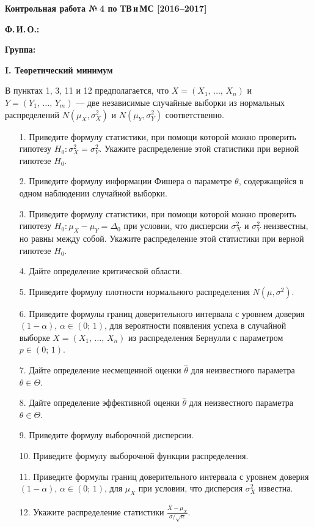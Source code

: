 \documentclass[a4paper, 12pt]{article}
\begin{document}
\begin{center}
    \textbf{\textbf{\large Контрольная работа №\,4 по ТВ\,и\,МС [2016--2017]}}
\end{center}


\textbf{Ф.\,И.\,О.:}

\textbf{Группа:}

\bigskip

\textbf{I. Теоретический минимум}

\medskip

В пунктах 1, 3, 11 и 12 предполагается, что $X = (X_1, \, \ldots, \, X_n)$ и $Y = (Y_1, \, \ldots, \, Y_m)$ --- две независимые случайные выборки из нормальных распределений $N(\mu_X, \sigma_X^2)$ и $N(\mu_Y, \sigma_Y^2)$ соответственно.

\begin{itemize}
  \item[1.] Приведите формулу статистики, при помощи которой можно проверить гипотезу $H_0 \colon \sigma_X^2 = \sigma_Y^2$. Укажите распределение этой статистики при верной гипотезе $H_0$.
  \item[2.] Приведите формулу информации Фишера о параметре $\theta$, содержащейся в одном наблюдении случайной выборки.
  \item[3.] Приведите формулу статистики, при помощи которой можно проверить гипотезу $H_0 \colon \mu_X - \mu_Y = \Delta_0$ при условии, что дисперсии $\sigma_X^2$ и $\sigma_Y^2$ неизвестны, но равны между собой. Укажите распределение этой статистики при верной гипотезе $H_0$.
  \item[4.] Дайте определение критической области.
  \item[5.] Приведите формулу плотности нормального распределения $N(\mu, \sigma^2)$.
  \item[6.] Приведите формулы границ доверительного интервала с уровнем доверия $(1 - \alpha)$, $\alpha \in (0;\,1)$, для вероятности появления успеха в случайной выборке $X = (X_1, \, \ldots, \, X_n)$ из распределения Бернулли с параметром $p \in (0;\,1)$.
  \item[7.] Дайте определение несмещенной оценки $\widehat{\theta}$ для неизвестного параметра $\theta \in \Theta$.
  \item[8.] Дайте определение эффективной оценки $\widehat{\theta}$ для неизвестного параметра $\theta \in \Theta$.
  \item[9.] Приведите формулу выборочной дисперсии.
  \item[10.] Приведите формулу выборочной функции распределения.
  \item[11.] Приведите формулы границ доверительного интервала с уровнем доверия $(1 - \alpha)$, $\alpha \in (0;\,1)$, для $\mu_X$ при условии, что дисперсия $\sigma_X^2$ известна.
  \item[12.] Укажите распределение статистики $\frac{\overline{X} - \mu_X}{\sigma / \sqrt{n}}$.
\end{itemize}
\bigskip
\end{document}
